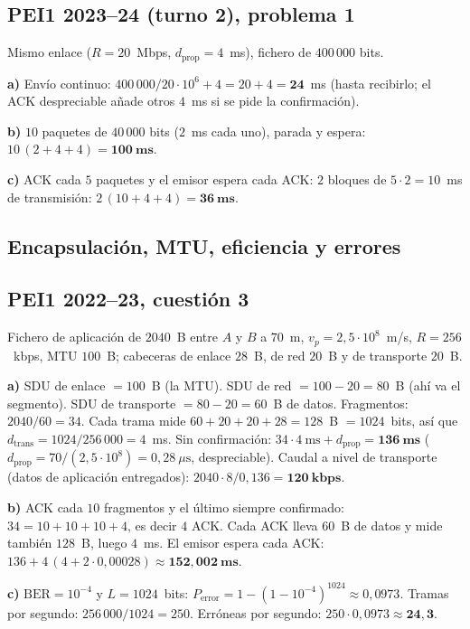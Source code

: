 \documentclass[11pt,a4paper]{article}
\begin{document}
\subsection*{PEI1 2023--24 (turno 2), problema 1}
Mismo enlace ($R=20$~Mbps, $d_{\text{prop}}=4$~ms), fichero de $400\,000$ bits.

\textbf{a)} Envío continuo: $400\,000/20\cdot10^{6}+4=20+4=\mathbf{24}$~ms (hasta recibirlo; el ACK despreciable añade otros $4$~ms si se pide la confirmación).

\textbf{b)} $10$ paquetes de $40\,000$ bits ($2$~ms cada uno), parada y espera: $10\,(2+4+4)=\mathbf{100~ms}$.

\textbf{c)} ACK cada $5$ paquetes y el emisor espera cada ACK: $2$ bloques de $5\cdot2=10$~ms de transmisión: $2\,(10+4+4)=\mathbf{36~ms}$.

\subsection{Encapsulación, MTU, eficiencia y errores}

\subsection*{PEI1 2022--23, cuestión 3}
Fichero de aplicación de $2040$~B entre $A$ y $B$ a $70$~m, $v_p=2{,}5\cdot10^{8}$~m/s, $R=256$~kbps, MTU $100$~B; cabeceras de enlace $28$~B, de red $20$~B y de transporte $20$~B.

\textbf{a)} SDU de enlace $=100$~B (la MTU). SDU de red $=100-20=80$~B (ahí va el segmento). SDU de transporte $=80-20=60$~B de datos. Fragmentos: $2040/60=34$. Cada trama mide $60+20+20+28=128$~B $=1024$~bits, así que $d_{\text{trans}}=1024/256\,000=4$~ms. Sin confirmación: $34\cdot4~\text{ms}+d_{\text{prop}}=\mathbf{136~ms}$ ($d_{\text{prop}}=70/(2{,}5\cdot10^{8})=0{,}28~\mu\text{s}$, despreciable). Caudal a nivel de transporte (datos de aplicación entregados): $2040\cdot8/0{,}136=\mathbf{120~kbps}$.

\textbf{b)} ACK cada $10$ fragmentos y el último siempre confirmado: $34=10+10+10+4$, es decir $4$ ACK. Cada ACK lleva $60$~B de datos y mide también $128$~B, luego $4$~ms. El emisor espera cada ACK: $136+4\,(4+2\cdot0{,}00028)\approx\mathbf{152{,}002~ms}$.

\textbf{c)} $\text{BER}=10^{-4}$ y $L=1024$~bits: $P_{\text{error}}=1-(1-10^{-4})^{1024}\approx0{,}0973$. Tramas por segundo: $256\,000/1024=250$. Erróneas por segundo: $250\cdot0{,}0973\approx\mathbf{24{,}3}$.
\end{document}
